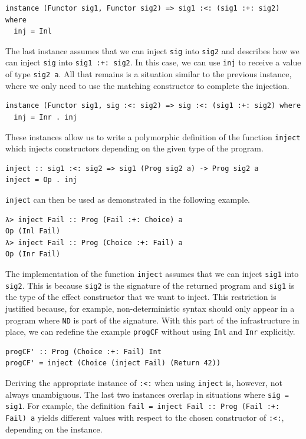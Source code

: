 \documentclass[a4paper, 11pt, fleqn, twoside, abstract=on]{scrreprt}
\newcommand{\hinl}[1]{\texttt{#1}}
\begin{document}
\begin{verbatim}
instance (Functor sig1, Functor sig2) => sig1 :<: (sig1 :+: sig2) where
  inj = Inl
\end{verbatim}

The last instance assumes that we can inject \hinl{sig} into \hinl{sig2} and describes how we can inject \hinl{sig} into \hinl{sig1 :+: sig2}.
In this case, we can use \hinl{inj} to receive a value of type \hinl{sig2 a}.
All that remains is a situation similar to the previous instance, where we only need to use the matching constructor to complete the injection.
 
\begin{verbatim}
instance (Functor sig1, sig :<: sig2) => sig :<: (sig1 :+: sig2) where
  inj = Inr . inj
\end{verbatim}

These instances allow us to write a polymorphic definition of the function \hinl{inject} which injects constructors depending on the given type of the program.

\begin{verbatim}
inject :: sig1 :<: sig2 => sig1 (Prog sig2 a) -> Prog sig2 a
inject = Op . inj
\end{verbatim}

\hinl{inject} can then be used as demonstrated in the following example.

\begin{verbatim}
λ> inject Fail :: Prog (Fail :+: Choice) a
Op (Inl Fail)
λ> inject Fail :: Prog (Choice :+: Fail) a
Op (Inr Fail)
\end{verbatim}

The implementation of the function \hinl{inject} assumes that we can inject \hinl{sig1} into \hinl{sig2}.
This is because \hinl{sig2} is the signature of the returned program and \hinl{sig1} is the type of the effect constructor that we want to inject.
This restriction is justified because, for example, non-deterministic syntax should only appear in a program where \hinl{ND} is part of the signature.
With this part of the infrastructure in place, we can redefine the example \hinl{progCF} without using \hinl{Inl} and \hinl{Inr} explicitly.

\begin{verbatim}
progCF' :: Prog (Choice :+: Fail) Int
progCF' = inject (Choice (inject Fail) (Return 42))
\end{verbatim}

Deriving the appropriate instance of \hinl{:<:} when using \hinl{inject} is, however, not always unambiguous.
The last two instances overlap in situations where \hinl{sig = sig1}.
For example, the definition \hinl{fail = inject Fail :: Prog (Fail :+: Fail) a} yields different values with respect to the chosen constructor of \hinl{:<:}, depending on the instance.
\end{document}
